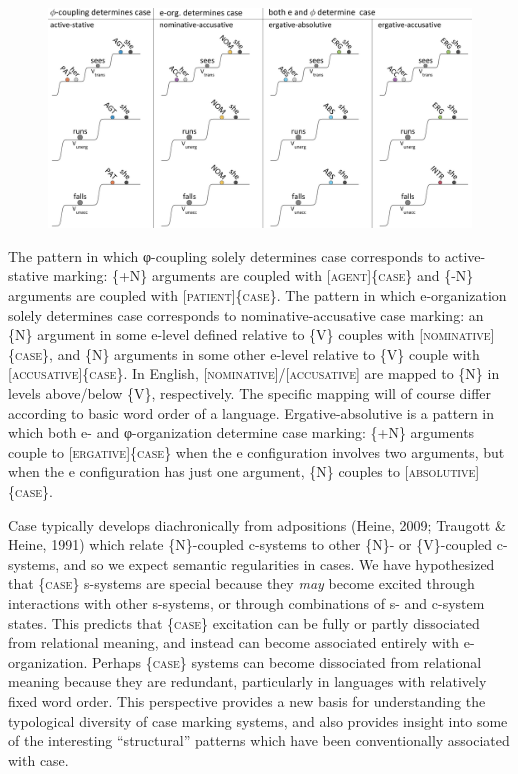   
\begin{figure}
\includegraphics[width=\textwidth]{figures/Tilsen-img70.png}
\caption{\missingcaption}
\label{fig:}
\end{figure}
 

  The pattern in which φ-coupling solely determines case corresponds to active-stative marking: \{+N\} arguments are coupled with [\textsc{agent}]\{\textsc{case}\} and \{-N\} arguments are coupled with [\textsc{patient}]\{\textsc{case}\}. The pattern in which e-organization solely determines case corresponds to nominative-accusative case marking: an \{N\} argument in some e-level defined relative to \{V\} couples with [\textsc{nominative}]\{\textsc{case}\}, and \{N\} arguments in some other e-level relative to \{V\} couple with [\textsc{accusative}]\{\textsc{case\}}. In English, [\textsc{nominative}]/[\textsc{accusative}] are mapped to \{N\} in levels above/below \{V\}, respectively. The specific mapping will of course differ according to basic word order of a language. Ergative-absolutive is a pattern in which both e- and φ-organization determine case marking: \{+N\} arguments couple to [\textsc{ergative}]\{\textsc{case}\} when the e configuration involves two arguments, but when the e configuration has just one argument, \{N\} couples to [\textsc{absolutive}]\{\textsc{case}\}.

  Case typically develops diachronically from adpositions (Heine, 2009; Traugott \& Heine, 1991) which relate \{N\}-coupled c-systems to other \{N\}- or \{V\}-coupled c-systems, and so we expect semantic regularities in cases. We have hypothesized that \{\textsc{case}\} s-systems are special because they \textit{may} become excited through interactions with other s-systems, or through combinations of s- and c-system states. This predicts that \{\textsc{case}\} excitation can be fully or partly dissociated from relational meaning, and instead can become associated entirely with e-organization. Perhaps \{\textsc{case}\} systems can become dissociated from relational meaning because they are redundant, particularly in languages with relatively fixed word order. This perspective provides a new basis for understanding the typological diversity of case marking systems, and also provides insight into some of the interesting “structural” patterns which have been conventionally associated with case. 

